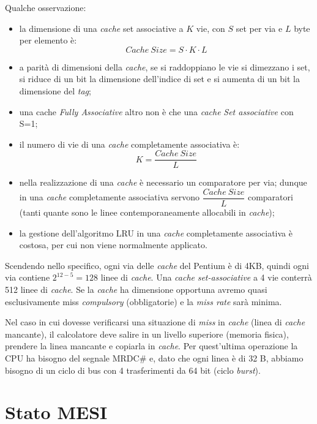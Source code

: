 Qualche osservazione:
\begin{itemize}
\item la dimensione di una \textit{cache} set associative a $K$ vie, con $S$ set per via e $L$ byte per elemento è:
\[ 
Cache ~ Size = S\cdot K \cdot L
\]
\item  a parità di dimensioni della \textit{cache}, se si raddoppiano le vie si dimezzano i set, si riduce di un bit la dimensione dell'indice di set e si aumenta di un bit la dimensione del \textit{tag};
\item  una cache \textit{Fully Associative} altro non è che una \textit{cache} \textit{Set associative} con
S=1;
\item  il numero di vie di una \textit{cache} completamente associativa è:
\[
K =\dfrac{ Cache ~ Size}{L}
\]
\item  nella realizzazione di una \textit{cache} è necessario un comparatore per via; dunque in una \textit{cache} completamente associativa servono $\dfrac{ Cache ~ Size}{L}$ comparatori (tanti quante sono le linee contemporaneamente allocabili in \textit{cache});
\item  la gestione dell'algoritmo LRU in una \textit{cache} completamente associativa è costosa, per cui non viene normalmente applicato.
\end{itemize}

Scendendo nello specifico, ogni via delle \textit{cache} del Pentium è di 4KB, quindi ogni via contiene $2^{12-5}= 128$ linee di \textit{cache}. Una \textit{cache} \textit{set-associative} a 4 vie conterrà 512 linee di \textit{cache}. Se la \textit{cache} ha dimensione opportuna avremo quasi esclusivamente miss \textit{compulsory} (obbligatorie) e la \textit{miss rate} sarà minima.

Nel caso in cui dovesse verificarsi una situazione di \textit{miss} in \textit{cache} (linea di \textit{cache} mancante), il calcolatore deve salire in un livello superiore (memoria fisica), prendere la linea mancante e copiarla in \textit{cache}. Per quest'ultima operazione la CPU ha bisogno del segnale MRDC\# e, dato che ogni linea è di 32 B, abbiamo bisogno di un ciclo di bus con 4 trasferimenti da 64 bit (ciclo \textit{burst}).

\section{Stato MESI}
\label{sec:mesi}

